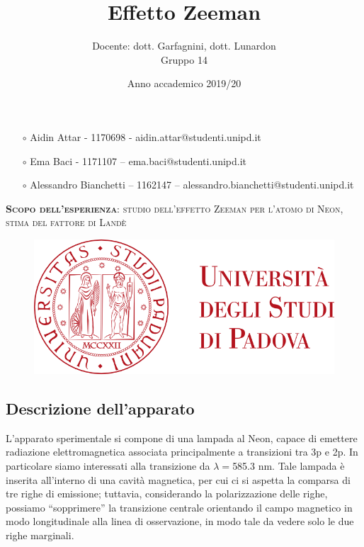 \documentclass{article}
\title{Effetto Zeeman}
\author{Docente: dott. Garfagnini, dott. Lunardon \\
	Gruppo 14}
\date{Anno accademico 2019/20}
\begin{document}
	
	
	
	\maketitle
	
	\begin{itemize}
		\item[$\circ$] Aidin Attar - 1170698 - aidin.attar@studenti.unipd.it
		\item[$\circ$] Ema Baci - 1171107 – ema.baci@studenti.unipd.it
		\item[$\circ$] Alessandro Bianchetti – 1162147 – alessandro.bianchetti@studenti.unipd.it
	\end{itemize}
	
	\vspace{3 cm}
	\begin{large}\textsc{\textbf{Scopo dell'esperienza}: studio dell'effetto Zeeman per  l'atomo di Neon, stima del fattore di Landè} 
	\end{large}
	\vspace{8.5cm}
	
	\begin{figure}[H]
		\centering
	\includegraphics[scale = 0.5 , angle=0]{unipd_logo.png}
	\end{figure}
	
	
	\twocolumn
	
	\subsection*{Descrizione dell'apparato} 
	
	L'apparato sperimentale si compone di una lampada al Neon, capace di emettere
	radiazione elettromagnetica associata principalmente a transizioni tra 3p e 2p.
	In particolare siamo interessati alla transizione da $\lambda = $585.3 nm.
	Tale lampada è inserita all'interno di una cavità magnetica, per cui ci si 
	aspetta la comparsa di tre righe di emissione; tuttavia, considerando la 
	polarizzazione delle righe, possiamo “sopprimere” la transizione centrale
	orientando il campo magnetico in modo longitudinale alla linea di 
	osservazione, in modo tale da vedere solo le due righe marginali. 
	
\end{document}
